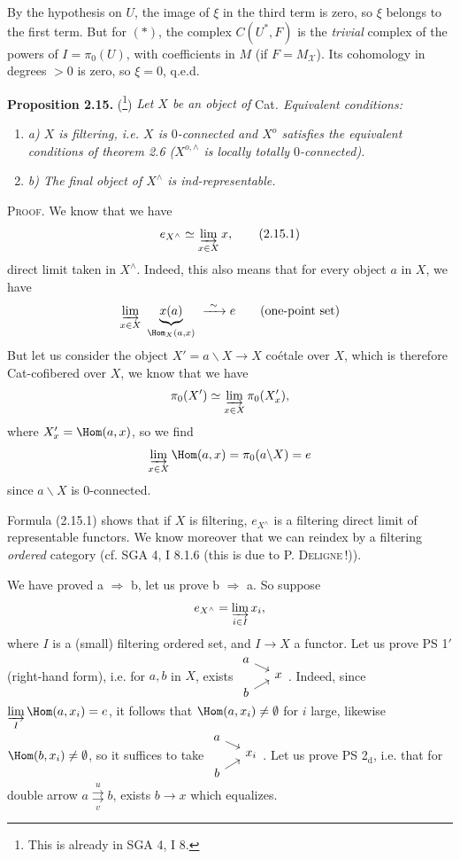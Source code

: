 
By the hypothesis on $U$, the image of $\xi$ in the third term is zero, so $\xi$ belongs to the first term. But for $(*)$, the complex $C(U^*,F)$ is the \textit{trivial} complex of the powers of $I=\pi_0(U)$, with coefficients in $M$ (if $F=M_{\mathcal{X}}$). Its cohomology  in degrees $>0$ is zero, so $\xi=0$, q.e.d.

\noindent\textbf{Proposition 2.15.} (\footnote[39]{This is already in SGA 4, I 8.}) \textit{Let $X$ be an object of} Cat\textit{. Equivalent conditions:}
\begin{enumerate}[label={}, leftmargin=2em, itemsep=0pt]
\item \textit{a) $X$ is filtering, i.e. $X$ is $0$-connected and $X^o$ satisfies the equivalent conditions of theorem 2.6 ($X^{o,\wedge}$ is locally totally $0$-connected).}
\item \textit{b) The final object of $X^\wedge$ is ind-representable.}
\end{enumerate}
\noindent\textsc{Proof}. We know that we have
\[
e_{X^\wedge} \simeq \varinjlim_{x \in X} x, \tag*{(2.15.1)}
\]
direct limit taken in $X^\wedge$. Indeed, this also means that for every object $a$ in $X$, we have
\[
\varinjlim_{x \in X} \ \underbrace{x(a)}_{\Hom_X(a,x)} \ \xrightarrow{\ \sim\ } e \qquad \text{(one-point set)}
\]
But let us consider the object $X' = a\backslash X \longrightarrow X$ coétale over $X$, which is therefore Cat-cofibered over $X$, we know that we have
\[
\pi_0(X') \simeq \varinjlim_{x \in X} \pi_0(X'_x),
\]
where $X'_x = \Hom(a,x)$, so we find
\[
\varinjlim_{x \in X} \Hom(a,x) = \pi_0(a\backslash X) = e
\]
since $a\backslash X$ is 0-connected.

Formula (2.15.1) shows that if  $X$ is filtering, $e_{X^\wedge}$ is a filtering direct limit of representable functors. We know moreover that we can reindex by a filtering \textit{ordered} category (cf. SGA 4, I 8.1.6 (this is due to P. \textsc{Deligne}\,!)).

We have proved a $\Longrightarrow$ b, let us prove b $\Longrightarrow$ a. So suppose
\[
e_{X^\wedge} = \varinjlim_{i \in I} x_i,
\]
where $I$ is a (small) filtering ordered set, and $I \longrightarrow X$ a functor. Let us prove PS 1$'$ (right-hand form), i.e. for $a, b$ in $X$, exists $\vcenter{\hbox{\begin{tikzcd}[row sep=0.1em, column sep=1.2em]
a \arrow[dr] & \\
& x \\
b \arrow[ur] &
\end{tikzcd}}}$. Indeed, since $\varinjlim\limits_{I} \Hom(a,x_i) = e$, it follows that $\Hom(a,x_i) \neq \emptyset$ for $i$ large, likewise $\Hom(b,x_i) \neq \emptyset$, so it suffices to take $\vcenter{\hbox{\begin{tikzcd}[row sep=0.1em, column sep=1.2em]
a \arrow[dr] & \\
& x_i \\
b \arrow[ur] &
\end{tikzcd}}}$. Let us prove PS 2$_{\mathrm{d}}$, i.e. that for double arrow $a \overset{u}{\underset{v}{\rightrightarrows}} b$, exists $b \longrightarrow x$ which equalizes.

